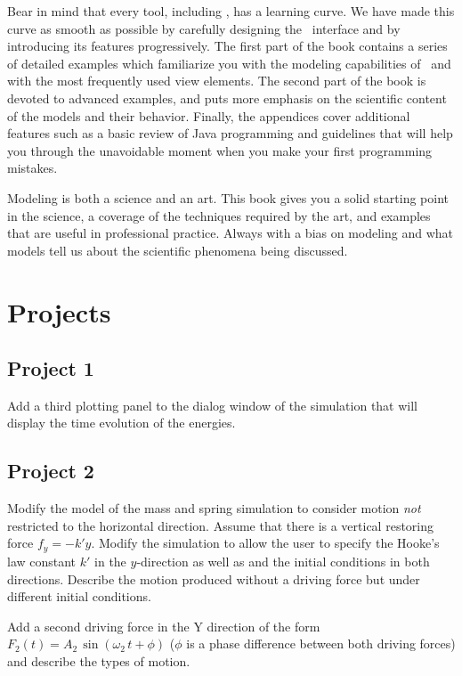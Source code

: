 Bear in mind that every tool, including \Ejs, has a learning curve. We have made this curve as smooth as possible by carefully designing the \ejs\ interface and by introducing its features progressively. The first part of the book contains a series of detailed examples which familiarize you with the modeling capabilities of \ejs\ and with the most frequently used view elements. The second part of the book is devoted to advanced examples, and puts more emphasis on the scientific content of the models and their behavior. Finally, the appendices cover additional features such as a basic review of Java programming and guidelines that will help you through the unavoidable moment when you make your first programming mistakes.

Modeling is both a science and an art. This book gives you a solid starting point in the science, a coverage of the techniques required by the art, and examples that are useful in professional practice. Always with a bias on modeling and what models tell us about the scientific phenomena being discussed.


\section{Projects}\label{section:02Projects}

\subsection*{Project 1}
Add a third plotting panel to the dialog window of the  simulation that will display the time evolution of the energies.

\subsection*{Project 2}
Modify the model of the mass and spring simulation to consider motion \emph{not} restricted to the horizontal direction.  Assume that there is a vertical restoring force $f_y=-k' y$. Modify the simulation to allow the user to specify the Hooke's law constant $k'$ in the $y$-direction as well as and the initial conditions in both directions. Describe the motion produced without a driving force but under different initial conditions.

Add a second driving force in the Y direction of the form $F_2(t)=A_2\,\sin(\omega_2\, t + \phi)$ ($\phi$ is a phase difference between both driving forces) and describe the types of motion.

